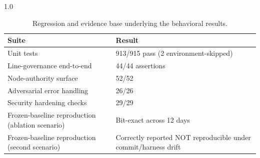 \begin{table}[!t]
\centering
\caption{Regression and evidence base underlying the behavioral results.}
\label{tab:quality}
\small
\begin{spacing}{1.0}
\begin{tabularx}{\columnwidth}{@{}p{}X@{}}
\toprule
Suite & Result \\
\midrule
Unit tests & 913/915 pass (2 environment-skipped) \\
Line-governance end-to-end & 44/44 assertions \\
Node-authority surface & 52/52 \\
Adversarial error handling & 26/26 \\
Security hardening checks & 29/29 \\
Frozen-baseline reproduction (ablation scenario) & Bit-exact across 12 days \\
Frozen-baseline reproduction (second scenario) & Correctly reported NOT reproducible under commit/harness drift \\
\bottomrule
\end{tabularx}
\end{spacing}
\end{table}
